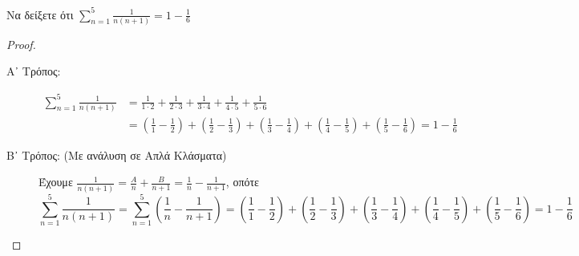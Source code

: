 \documentclass[main.tex]{subfiles}
\begin{document}
\begin{example}
  Να δείξετε ότι $ \sum_{n=1}^{5} \frac{1}{n(n+1)} = 1 - \frac{1}{6}  $
\end{example}
\begin{proof}
\item {}
  \begin{description}
    \item [Α᾽ Τρόπος:]
      \begin{align*}
        \sum_{n=1}^{5} \frac{1}{n(n+1)} 
        &= \frac{1}{1\cdot 2} + \frac{1}{2 \cdot 3} + \frac{1}{3 \cdot 4} 
        + \frac{1}{4 \cdot 5} + \frac{1}{5 \cdot 6} \\
        &= \left(\frac{1}{1} - \frac{1}{2}\right) + \left(\frac{1}{2} 
        - \frac{1}{3} \right) + \left(\frac{1}{3} - \frac{1}{4}\right) 
        + \left(\frac{1}{4} - \frac{1}{5}\right) +
        \left(\frac{1}{5} - \frac{1}{6}\right)  = 1 - \frac{1}{6}
      \end{align*}
    \item [Β᾽ Τρόπος: (Με ανάλυση σε Απλά Κλάσματα)]
      Έχουμε $ \frac{1}{n(n+1)} = \frac{A}{n} + \frac{B}{n+1} = 
      \frac{1}{n} - \frac{1}{n+1}$, οπότε
      \begin{equation*}
        \sum_{n=1}^{5} \frac{1}{n(n+1)} = \sum_{n=1}^{5} \left(\frac{1}{n} - 
        \frac{1}{n+1}\right)    
        = \left(\frac{1}{1} - \frac{1}{2}\right) + \left(\frac{1}{2} 
        - \frac{1}{3} \right) + \left(\frac{1}{3} - \frac{1}{4}\right) 
        + \left(\frac{1}{4} - \frac{1}{5}\right) +
        \left(\frac{1}{5} - \frac{1}{6}\right)  = 1 - \frac{1}{6}
      \end{equation*} 
  \end{description}
\end{proof}

\end{document}
